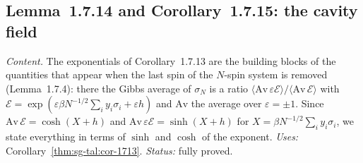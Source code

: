 \subsection{Lemma~1.7.14 and Corollary~1.7.15: the cavity field}
\label{sec:sg-tal:fluct-cavity-field}

\emph{Content.}  The exponentials of Corollary~1.7.13 are the building blocks of the quantities that appear when the last spin of the $N$-spin system is removed (Lemma~1.7.4): there the Gibbs average of $\sigma_N$ is a ratio
$\langle\mathrm{Av}\,\varepsilon\mathcal E\rangle/\langle\mathrm{Av}\,\mathcal E\rangle$ with $\mathcal E=\exp(\varepsilon\beta N^{-1/2}\sum_iy_i\sigma_i+\varepsilon h)$ and $\mathrm{Av}$ the average over $\varepsilon=\pm1$.
Since $\mathrm{Av}\,\mathcal E=\cosh(X+h)$ and $\mathrm{Av}\,\varepsilon\mathcal E=\sinh(X+h)$ for $X=\beta N^{-1/2}\sum_iy_i\sigma_i$, we state everything in terms of $\sinh$ and $\cosh$ of the exponent.
\emph{Uses:} Corollary~\ref{thm:sg-tal:cor-1713}.  \emph{Status:} fully proved.

